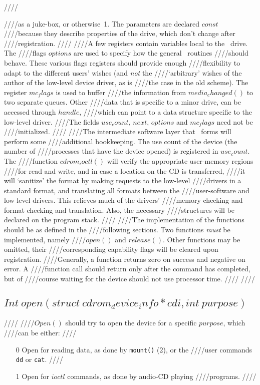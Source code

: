 ////\documentclass{article}
\begin{document}
////as a juke-box, or otherwise~1. The parameters are declared $const$
////because they describe properties of the drive, which don't change after
////registration.
////
////A few registers contain variables local to the \cdrom\ drive. The
////flags $options$ are used to specify how the general \cdrom\ routines
////should behave. These various flags registers should provide enough
////flexibility to adapt to the different users' wishes (and {\em not\/} the
////`arbitrary' wishes of the author of the low-level device driver, as is
////the case in the old scheme). The register $mc_flags$ is used to buffer
////the information from $media_changed()$ to two separate queues. Other
////data that is specific to a minor drive, can be accessed through $handle$,
////which can point to a data structure specific to the low-level driver.
////The fields $use_count$, $next$, $options$ and $mc_flags$ need not be
////initialized.
////
////The intermediate software layer that \cdromc\ forms will perform some
////additional bookkeeping. The use count of the device (the number of
////processes that have the device opened) is registered in $use_count$. The
////function $cdrom_ioctl()$ will verify the appropriate user-memory regions
////for read and write, and in case a location on the CD is transferred,
////it will `sanitize' the format by making requests to the low-level
////drivers in a standard format, and translating all formats between the
////user-software and low level drivers. This relieves much of the drivers'
////memory checking and format checking and translation. Also, the necessary
////structures will be declared on the program stack.
////
////The implementation of the functions should be as defined in the
////following sections. Two functions {\em must\/} be implemented, namely
////$open()$ and $release()$. Other functions may be omitted, their
////corresponding capability flags will be cleared upon registration.
////Generally, a function returns zero on success and negative on error. A
////function call should return only after the command has completed, but of
////course waiting for the device should not use processor time.
////
////\subsection{$Int\ open(struct\ cdrom_device_info * cdi, int\ purpose)$}
////
////$Open()$ should try to open the device for a specific $purpose$, which
////can be either:
////\begin{itemize}
////\item[0] Open for reading data, as done by {\tt {mount()}} (2), or the
////user commands {\tt {dd}} or {\tt {cat}}.  
////\item[1] Open for $ioctl$ commands, as done by audio-CD playing
////programs.
////\end{itemize}
\end{document}
